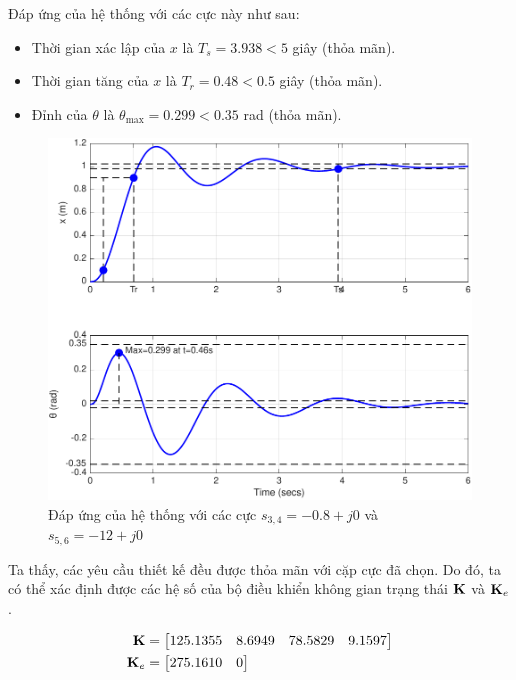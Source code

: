\documentclass[12pt,a4paper]{article}
\begin{document}
Đáp ứng của hệ thống với các cực này như sau:

\begin{itemize}
    \item Thời gian xác lập của $x$ là $T_s = 3.938 < 5$ giây (thỏa mãn).
    \item Thời gian tăng của $x$ là $T_r = 0.48 < 0.5$ giây (thỏa mãn).
    \item Đỉnh của $\theta$ là $\theta_{\max} = 0.299 < 0.35$ rad (thỏa mãn).
\end{itemize}

\newpage

\begin{figure}[ht]
    \centering
    \includegraphics[width=0.75\linewidth]{ssc.pdf}
    \caption{Đáp ứng của hệ thống với các cực $s_{3,4} = -0.8 +j0$ và $s_{5,6}=-12 + j0$}
\end{figure}

Ta thấy, các yêu cầu thiết kế đều được thỏa mãn với cặp cực đã chọn. Do đó, ta có thể xác định được các hệ số của bộ điều khiển không gian trạng thái $\vb K$ và $\vb K_e$.

\begin{align*}
    \vb K &= \begin{bmatrix}
        125.1355   & 8.6949  &  78.5829  &  9.1597
    \end{bmatrix}\\
    \vb K_e& = \begin{bmatrix}
        275.1610         & 0
    \end{bmatrix}
\end{align*}

\newpage

\end{document}
